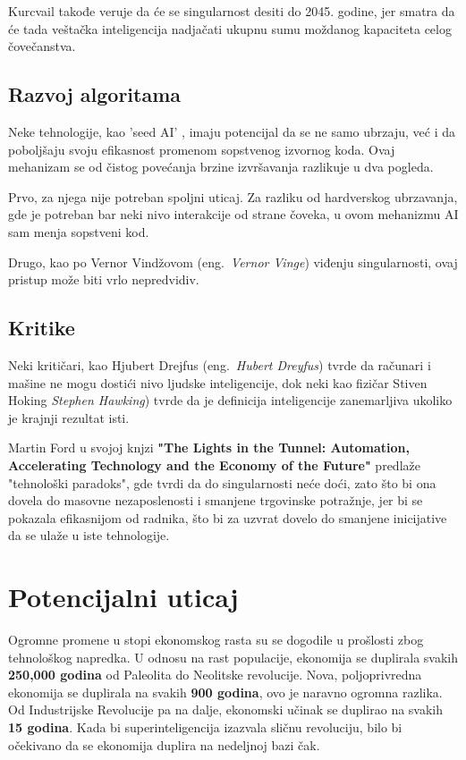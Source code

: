 \documentclass[a4paper]{article}
\begin{document}
Kurcvail takođe veruje da će se singularnost desiti do 2045. godine, jer smatra da će tada veštačka inteligencija nadjačati ukupnu sumu moždanog kapaciteta celog čovečanstva. \cite{mog-6}


\subsection{Razvoj algoritama}

Neke tehnologije, kao 'seed AI' \cite{mog-7}, imaju potencijal da se ne samo ubrzaju, već i da poboljšaju svoju efikasnost promenom sopstvenog izvornog koda. 
Ovaj mehanizam se od čistog povećanja brzine izvršavanja razlikuje u dva pogleda.

Prvo, za njega nije potreban spoljni uticaj. Za razliku od hardverskog ubrzavanja, gde je potreban bar neki nivo interakcije od strane čoveka, u ovom mehanizmu AI sam menja sopstveni kod.

Drugo, kao po Vernor Vindžovom (eng.~{\em Vernor Vinge}) viđenju singularnosti, ovaj pristup može biti vrlo nepredvidiv. \cite{mog-8}

\subsection{Kritike}

Neki kritičari, kao Hjubert Drejfus (eng.~{\em Hubert Dreyfus}) tvrde da računari i mašine ne mogu dostići nivo ljudske inteligencije, dok neki kao fizičar Stiven Hoking {\em Stephen Hawking}) tvrde da je definicija inteligencije zanemarljiva ukoliko je krajnji rezultat isti. \cite{mog-9}

Martin Ford u svojoj knjzi \textbf{"The Lights in the Tunnel: Automation, Accelerating Technology and the Economy of the Future"} predlaže "tehnološki paradoks", gde tvrdi da do singularnosti neće doći, zato što bi ona dovela do masovne nezaposlenosti i smanjene trgovinske potražnje, jer bi se pokazala efikasnijom od radnika, što bi za uzvrat dovelo do smanjene inicijative da se ulaže u iste tehnologije. \cite{mog-10}

\section{Potencijalni uticaj}
\label{sec:potencijalni_uticaj}
\hfill

Ogromne promene u stopi ekonomskog rasta su se dogodile u prošlosti zbog tehnološkog napredka. U odnosu na rast populacije, ekonomija se duplirala svakih \textbf{250,000 godina} od Paleolita do Neolitske revolucije. Nova, poljoprivredna ekonomija se duplirala na svakih \textbf{900 godina}, ovo je naravno ogromna razlika. Od Industrijske Revolucije pa na dalje, ekonomski učinak se duplirao na svakih \textbf{15 godina}. Kada bi superinteligencija izazvala sličnu revoluciju, bilo bi očekivano da se ekonomija duplira na nedeljnoj bazi čak.\cite{r1}
\end{document}
